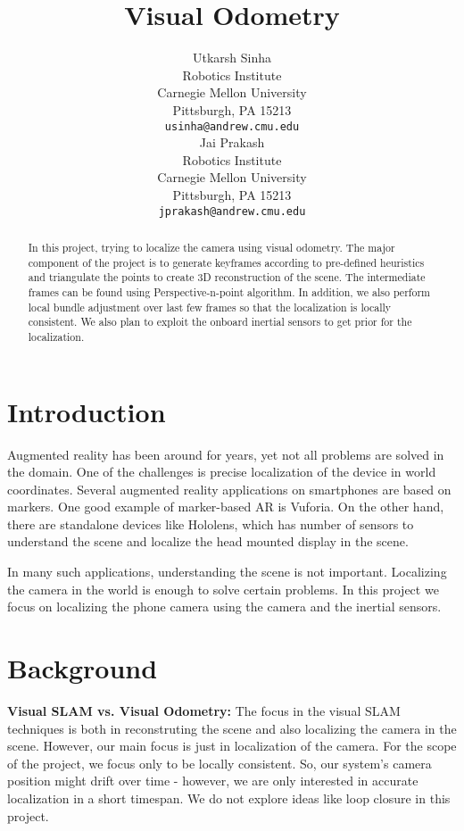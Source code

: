 \documentclass{article}
\title{Visual Odometry}
\author{
 Utkarsh Sinha \\
  Robotics Institute\\
 Carnegie Mellon University \\
 Pittsburgh, PA 15213\\
  \texttt{usinha@andrew.cmu.edu} \\
\And
  Jai Prakash\\
  Robotics Institute\\
  Carnegie Mellon University\\
  Pittsburgh, PA 15213\\
  \texttt{jprakash@andrew.cmu.edu} \\
}
\begin{document}

\maketitle

\begin{abstract}
In this project, trying to localize the camera using visual odometry. The major component of the project is to generate keyframes according to pre-defined heuristics and triangulate the points to create 3D reconstruction of the scene. The intermediate frames can be found using Perspective-n-point algorithm. In addition, we also perform local bundle adjustment over last few frames so that the localization is locally consistent. We also plan to exploit the onboard inertial sensors to get prior for the localization.
\end{abstract}

\section{Introduction}

Augmented reality has been around for years, yet not all problems are solved in the domain. One of the challenges is precise localization of the device in world coordinates. Several augmented reality applications on smartphones are based on markers. One good example of marker-based AR is Vuforia. On the other hand, there are standalone devices like Hololens, which has number of sensors to understand the scene and localize the head mounted display in the scene.

In many such applications, understanding the scene is not important. Localizing the camera in the world is enough to solve certain problems. In this project we focus on localizing the phone camera using the camera and the inertial sensors.


\section{Background}
\textbf{Visual SLAM vs. Visual Odometry: } The focus in the visual SLAM techniques is both in reconstruting the scene and also localizing the camera in the scene. However, our main focus is just in localization of the camera. For the scope of the project, we focus only to be locally consistent. So, our system's camera position might drift over time - however, we are only interested in accurate localization in a short timespan. We do not explore ideas like loop closure in this project.
\end{document}
